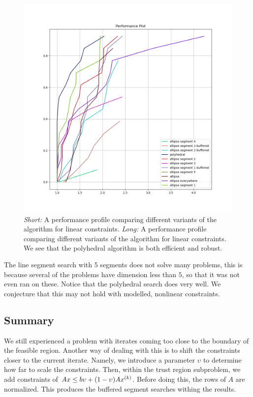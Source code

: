 \begin{figure}[ht]
    \centering
    \includegraphics[scale=0.4]{images/performance_profile_plot.png}
    \caption{
    	\emph{Short:} A performance profile comparing different variants of the algorithm for linear constraints.
    	\emph{Long:} A performance profile comparing different variants of the algorithm for linear constraints.
    	We see that the polyhedral algorithm is both efficient and robust.
    }
    \label{performance_profile}
\end{figure}



The line segment search with 5 segments does not solve many problems, this is because several of the problems have dimension less than $5$, so that it was not even ran on these.
Notice that the polyhedral search does very well.
We conjecture that this may not hold with modelled, nonlinear constraints.


\subsection{Summary}
We still experienced a problem with iterates coming too close to the boundary of the feasible region.
Another way of dealing with this is to shift the constraints closer to the current iterate.
Namely, we introduce a parameter $\upsilon$ to determine how far to scale the constraints.
Then, within the trust region subproblem, we add constraints of $Ax \le b\upsilon + (1-\upsilon) A x^{(k)} $.
Before doing this, the rows of $A$ are normalized.
This produces the buffered segment searches withing the results.

